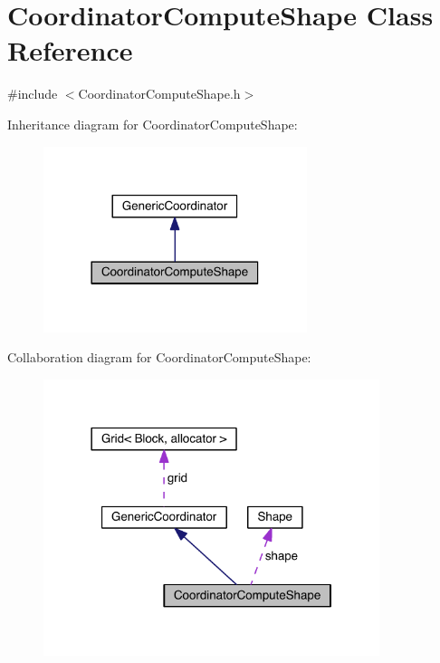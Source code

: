 \hypertarget{class_coordinator_compute_shape}{}\section{Coordinator\+Compute\+Shape Class Reference}
\label{class_coordinator_compute_shape}


{\ttfamily \#include $<$Coordinator\+Compute\+Shape.\+h$>$}



Inheritance diagram for Coordinator\+Compute\+Shape\+:\nopagebreak
\begin{figure}[H]
\begin{center}
\leavevmode
\includegraphics[width=218pt]{dd/d53/class_coordinator_compute_shape__inherit__graph}
\end{center}
\end{figure}


Collaboration diagram for Coordinator\+Compute\+Shape\+:\nopagebreak
\begin{figure}[H]
\begin{center}
\leavevmode
\includegraphics[width=278pt]{df/dcf/class_coordinator_compute_shape__coll__graph}
\end{center}
\end{figure}
